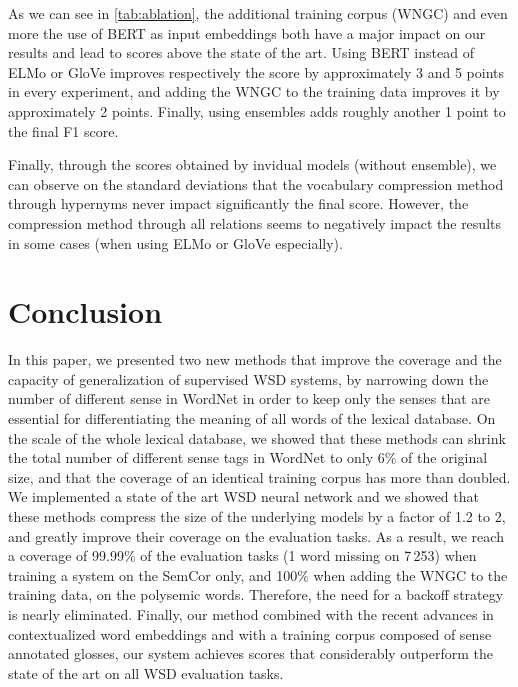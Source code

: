 \documentclass[11pt]{article}
\begin{document}
As we can see in \autoref{tab:ablation}, the additional training corpus (WNGC) and even more the use of BERT as input embeddings both have a major impact on our results and lead to scores above the state of the art. 
Using BERT instead of ELMo or GloVe improves respectively the score by 
approximately 3 and 5 points in every experiment, and adding the WNGC to the training data improves it by approximately 2 points. Finally, using ensembles adds roughly another 1 point to the final F1 score.


Finally, through the scores obtained by invidual models (without ensemble), we can observe on the standard deviations that the vocabulary compression method through hypernyms never impact significantly the final score. However, the compression method through all relations seems to negatively impact the results in some cases (when using ELMo or GloVe especially).


\section{Conclusion}
{
In this paper, we presented two new methods that improve the coverage and the capacity of generalization of supervised WSD systems, by narrowing down the number of different sense in WordNet in order to keep only the senses that are essential for differentiating the meaning of all words 
of the lexical database.
On the scale of the whole lexical database, we showed that these methods can shrink the total number of different sense tags in WordNet to only 6\% of the original size, and that the coverage of an identical training corpus has more than doubled.
We implemented a state of the art WSD neural network and we showed that these methods 
compress the size 
of the underlying models by a factor of 1.2 to 2, and greatly improve their coverage on the evaluation tasks. As a result, we reach a coverage of 99.99\% of the evaluation tasks (1 word missing on 7\,253) when training a system on the SemCor only, and 100\% when adding the WNGC to the training data, on the polysemic words. Therefore, the need for a backoff strategy is nearly eliminated.
Finally, our method combined with the recent advances in contextualized word embeddings and with a training corpus composed of sense annotated glosses, our system achieves scores that 
considerably outperform the state of the art on all WSD evaluation tasks.


}




\end{document}
